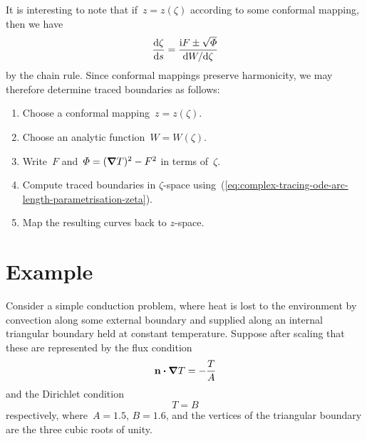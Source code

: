 It is interesting to note that
if~$z = z (\zeta)$ according to some conformal mapping,
then we have
\begin{equation}
  \tder{\zeta}{s} = \frac{\ii F \pm \sqrt{\Phi}}{\td W / {\td\zeta}}
  \label{eq:complex-tracing-ode-arc-length-parametrisation-zeta}
\end{equation}
by the chain rule.
Since conformal mappings preserve harmonicity,
we may therefore determine traced boundaries as follows:
\begin{enumerate}
  \tightlist
  \item
    Choose a conformal mapping~$z = z (\zeta)$.
  \item
    Choose an analytic function~$W = W (\zeta)$.
  \item
    Write~$F$ and~$\varPhi = (\mathop{}\!\boldsymbol{\mathbf{\nabla}} T)^2 - F^2$ in terms of~$\zeta$.
  \item
    Compute traced boundaries in $\zeta$-space
    using~(\ref{eq:complex-tracing-ode-arc-length-parametrisation-zeta}).
  \item
    Map the resulting curves back to $z$-space.
\end{enumerate}

\section{Example}
\label{sec:complex.example}

Consider a simple conduction problem,
where heat is lost to the environment
by convection along some external boundary
and supplied along an internal triangular boundary
held at constant temperature.
Suppose after scaling that these are represented
by the flux condition
\begin{equation}
  \mathop{}\!\boldsymbol{\mathbf{n}} \boldsymbol{\cdot} \mathop{}\!\boldsymbol{\mathbf{\nabla}} T = -\frac{T}{A}
  \label{eq:example-flux-boundary-condition}
\end{equation}
and the Dirichlet condition
\begin{equation}
  T = B
  \label{eq:example-dirichlet-condition}
\end{equation}
respectively,
where~$A = 1.5$, $B = 1.6$,
and the vertices of the triangular boundary
are the three cubic roots of unity.

